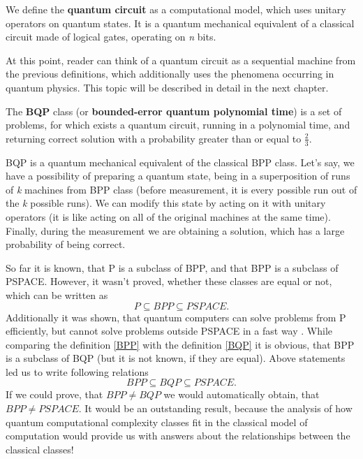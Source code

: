 \begin{definition}
We define the \textbf{quantum circuit} as a computational model, which uses unitary operators on quantum states. It is a quantum mechanical equivalent of a classical circuit made of logical gates, operating on \textit{n} bits.
\end{definition}

\begin{remark}
At this point, reader can think of a quantum circuit as a sequential machine from the previous definitions, which additionally uses the phenomena occurring in quantum physics. This topic will be described in detail in the next chapter.
\end{remark}

\begin{definition}\label{BQP}
The \textbf{BQP} class (or \textbf{bounded-error quantum polynomial time}) is a set of problems, for which exists a quantum circuit, running in a polynomial time, and returning correct solution with a probability greater than or equal to $\frac{2}{3}$.
\end{definition}

\begin{remark}
BQP is a quantum mechanical equivalent of the classical BPP class. Let's say, we have a possibility of preparing a quantum state, being in a superposition of runs of \textit{k} machines from BPP class (before measurement, it is every possible run out of the \textit{k} possible runs). We can modify this state by acting on it with unitary operators (it is like acting on all of the original machines at the same time). Finally, during the measurement we are obtaining a solution, which has a large probability of being correct.
\end{remark}

\begin{remark}
So far it is known, that P is a subclass of BPP, and that BPP is a subclass of PSPACE. However, it wasn't proved, whether these classes are equal or not, which can be written as
\[ P \subseteq BPP \subseteq PSPACE. \]
Additionally it was shown, that quantum computers can solve problems from P efficiently, but cannot solve problems outside PSPACE in a fast way \cite{nielsen_chuang}. While comparing the definition \ref{BPP} with the definition \ref{BQP} it is obvious, that BPP is a subclass of BQP (but it is not known, if they are equal). Above statements led us to write following relations
\[ BPP \subseteq BQP \subseteq PSPACE.\]
If we could prove, that $BPP \neq BQP$ we would automatically obtain, that $BPP \neq PSPACE$. It would be an outstanding result, because the analysis of how quantum computational complexity classes fit in the classical model of computation would provide us with answers about the relationships between the classical classes!
\end{remark}

